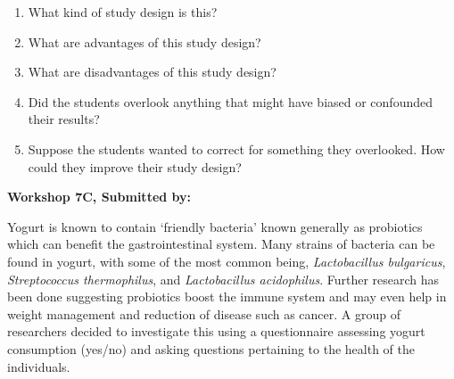 \documentclass[11pt, chapterprefix=true]{scrbook}\usepackage[]{graphicx}\usepackage[]{color}
\begin{document}
\begin{exercises}
\begin{exercise}
\begin{enumerate}
  \item What kind of study design is this?
  \item What are advantages of this study design?
  \item What are disadvantages of this study design?
  \item Did the students overlook anything that might have biased or confounded their results?
  \item Suppose the students wanted to correct for something they overlooked. How could they improve their study design?
\end{enumerate}

\end{exercise}
\begin{solution}  %

\end{solution}

\clearpage

    \begin{exercise}  %

    \begin{center}
\begin{flushleft}\textbf{\large \hfill Workshop 7C, Submitted by: }\end{flushleft}

\end{center}

Yogurt is known to contain `friendly bacteria' known generally as probiotics which can benefit the gastrointestinal system.  Many strains of bacteria can be found in yogurt, with some of the most common being, \textit{Lactobacillus bulgaricus}, \textit{Streptococcus thermophilus}, and \textit{Lactobacillus acidophilus}.  Further research has been done suggesting probiotics boost the immune system and may even help in weight management and reduction of disease such as cancer.  A group of researchers decided to investigate this using a questionnaire assessing yogurt consumption (yes/no) and asking questions pertaining to the health of the individuals.


\end{exercise}
\end{exercises}
\end{document}
